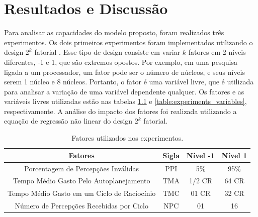 \chapter{Resultados e Discussão}

Para analisar as capacidades do modelo proposto, foram realizados três experimentos. Os dois primeiros experimentos foram implementados utilizando o design $2^k$ fatorial \cite{jain1990art}. Esse tipo de design consiste em variar $k$ fatores em 2 níveis diferentes, -1 e 1, que são extremos opostos. Por exemplo, em uma pesquisa ligada a um processador, um fator pode ser o número de núcleos, e seus níveis serem 1 núcleo e 8 núcleos. Portanto, o fator é uma variável livre, que é utilizada para analisar a variação de uma variável dependente qualquer. Os fatores e as variáveis livres utilizadas estão nas tabelas \ref{table:experiments_factors} e \ref{table:experiments_variables}, respectivamente. A análise do impacto dos fatores foi realizada utilizando a equação de regressão não linear do design $2^k$ fatorial. 

\begin{table}[h!]
    \begin{center}
        \caption{ Fatores utilizados nos experimentos. }
        \label{table:experiments_factors}
        \begin{tabular}{|c|c|c|c|}
        \hline
        \textbf{Fatores} & \textbf{Sigla} & \textbf{Nível -1} & \textbf{Nível 1} \\
        \hline
        Porcentagem de Percepções Inválidas & PPI & 5\% & 95\%  \\
        \hline
        Tempo Médio Gasto Pelo Autoplanejamento & TMA & 1/2 CR & 64 CR \\
        \hline
        Tempo Médio Gasto em um Ciclo de Raciocínio & TMC & 01 CR & 32 CR \\
        \hline
        Número de Percepções Recebidas por Ciclo & NPC & 01 & 16 \\
        \hline
    \end{tabular}{}
    \end{center}
\end{table}{}

